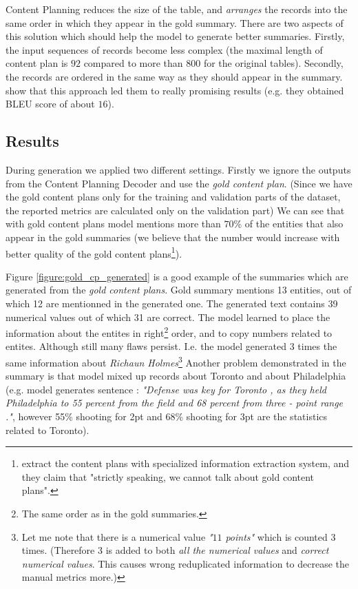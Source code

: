 Content Planning reduces the size of the table, and \emph{arranges} the records into the same order in which they appear in the gold summary. There are two aspects of this solution which should help the model to generate better summaries. Firstly, the input sequences of records become less complex (the maximal length of content plan is $92$ compared to more than $800$ for the original tables). Secondly, the records are ordered in the same way as they should appear in the summary. \citep{puduppully2019datatotext} show that this approach led them to really promising results (e.g. they obtained BLEU score of about $16$).

\subsection{Results}

During generation we applied two different settings. Firstly we ignore the outputs from the Content Planning Decoder and use the \emph{gold content plan}. (Since we have the gold content plans only for the training and validation parts of the dataset, the reported metrics are calculated only on the validation part) We can see that with gold content plans model mentions more than $70$\% of the entities that also appear in the gold summaries (we believe that the number would increase with better quality of the gold content plans\footnote{\citep{puduppully2019datatotext} extract the content plans with specialized information extraction system, and they claim that "strictly speaking, we cannot talk about gold content plans".}).

Figure \ref{figure:gold_cp_generated} is a good example of the summaries which are generated from the \emph{gold content plans}. Gold summary mentions 13 entities, out of which 12 are mentionned in the generated one. The generated text contains 39 numerical values out of which 31 are correct. The model learned to place the information about the entites in right\footnote{The same order as in the gold summaries.} order, and to copy numbers related to entites. Although still many flaws persist. I.e. the model generated 3 times the same information about \emph{Richaun Holmes}\footnote{Let me note that there is a numerical value \emph{"$11$ points"} which is counted 3 times. (Therefore $3$ is added to both \emph{all the numerical values} and \emph{correct numerical values}. This causes wrong reduplicated information to decrease the manual metrics more.)} Another problem demonstrated in the summary is that model mixed up records about Toronto and about Philadelphia (e.g. model generates sentence : \emph{"Defense was key for Toronto , as they held Philadelphia to 55 percent from the field and 68 percent from three - point range ."}, however 55\% shooting for 2pt and 68\% shooting for 3pt are the statistics related to Toronto).

